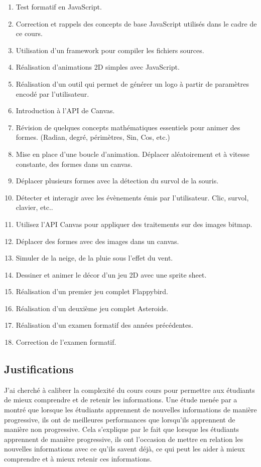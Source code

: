 \begin{enumerate}
    \item Test formatif en JavaScript.
    \item Correction et rappels des concepts de base JavaScript utilisés dans le cadre de ce cours.
    \item Utilisation d’un framework pour compiler les fichiers sources.
    \item Réalisation d'animations 2D simples avec JavaScript.
    \item Réalisation d’un outil qui permet de générer un logo à partir de paramètres encodé par l’utilisateur.
    \item Introduction à l’API de Canvas.
    \item Révision de quelques concepts mathématiques essentiels pour animer des formes. (Radian, degré, périmètres, Sin, Cos, etc.)
    \item Mise en place d’une boucle d’animation. Déplacer aléatoirement et à vitesse constante, des formes dans un canvas.
    \item Déplacer plusieurs formes avec la détection du survol de la souris.
    \item Détecter et interagir avec les évènements émis par l'utilisateur. Clic, survol, clavier, etc..
    \item Utilisez l’API Canvas pour appliquer des traitements sur des images bitmap.
    \item Déplacer des formes avec des images dans un canvas.
    \item Simuler de la neige, de la pluie sous l'effet du vent.
    \item Dessiner et animer le décor d’un jeu 2D avec une sprite sheet.
    \item Réalisation d’un premier jeu complet Flappybird.
    \item Réalisation d’un deuxième jeu complet Asteroids.
    \item Réalisation d’un examen formatif des années précédentes.
    \item Correction de l'examen formatif.
\end{enumerate}

\clearpage
\subsection{Justifications}

J'ai cherché à calibrer la complexité du cours cours pour permettre aux étudiants de mieux comprendre et de retenir les informations. Une étude menée par \citet{mayer2003nine} a montré que lorsque les étudiants apprennent de nouvelles informations de manière progressive, ils ont de meilleures performances que lorsqu'ils apprennent de manière non progressive. Cela s'explique par le fait que lorsque les étudiants apprennent de manière progressive, ils ont l'occasion de mettre en relation les nouvelles informations avec ce qu'ils savent déjà, ce qui peut les aider à mieux comprendre et à mieux retenir ces informations.

